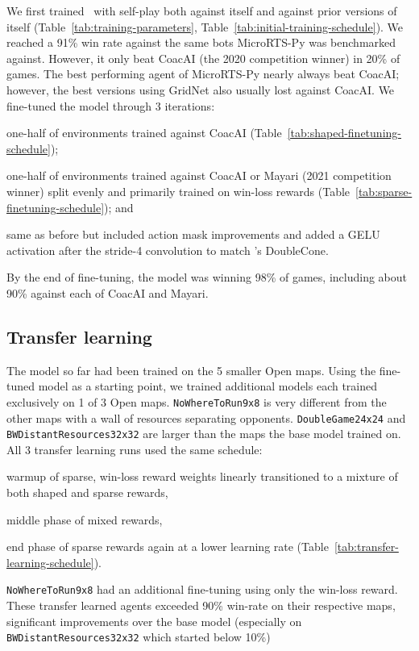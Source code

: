 \documentclass{article}
\begin{document}
We first trained \agentName\ with self-play both against itself and against prior
versions of itself (Table~\ref{tab:training-parameters},
Table~\ref{tab:initial-training-schedule}). We reached a 91\% win rate against the same bots MicroRTS-Py was
benchmarked against. However, it only beat CoacAI (the 2020 competition winner) in 20\%
of games. The best performing agent of MicroRTS-Py nearly always beat CoacAI; however,
the best versions using GridNet also usually lost against CoacAI. We fine-tuned
the model through 3 iterations:
\begin{inparaenum}[(1)]
    \item one-half of environments trained against CoacAI (Table~\ref{tab:shaped-finetuning-schedule});
    \item one-half of environments trained against CoacAI or Mayari (2021 competition
    winner) split evenly and primarily trained on win-loss rewards (Table~\ref{tab:sparse-finetuning-schedule}); and
    \item same as before but included action mask improvements and added a GELU activation
    after the stride-4 convolution to match \citet{Ferdinand2021doublecone}'s DoubleCone.
\end{inparaenum}
By the end of fine-tuning, the model was winning 98\% of games, including about 90\%
against each of CoacAI and Mayari.

\subsection{Transfer learning}
The model so far had been trained on the 5 smaller Open maps. Using the
fine-tuned model as a starting point, we trained additional models each trained exclusively
on 1 of 3 Open maps. \texttt{NoWhereToRun9x8} is very different from the other maps with a wall of
resources separating opponents. \texttt{DoubleGame24x24} and
\texttt{BWDistantResources32x32} are larger than the maps the base model trained on.
All 3 transfer learning runs used the same schedule:
\begin{inparaenum}[(1)]
    \item warmup of sparse, win-loss reward weights linearly transitioned to a mixture
    of both shaped and sparse rewards,
    \item middle phase of mixed rewards,
    \item end phase of sparse rewards again at a lower learning rate (Table~\ref{tab:transfer-learning-schedule}).
\end{inparaenum}
\texttt{NoWhereToRun9x8} had an additional fine-tuning using only the win-loss reward.
These transfer learned agents exceeded 90\% win-rate on their respective maps,
significant improvements over the base model (especially on
\texttt{BWDistantResources32x32} which started below 10\%)
\end{document}
